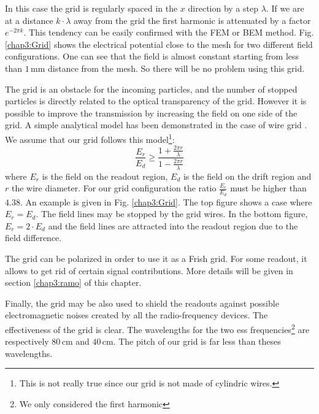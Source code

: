 \begin{refsection}
  In this case the grid is regularly spaced in the $x$ direction by a step $\lambda$. If we are at a distance $k \cdot \lambda$ away from the grid the first harmonic is attenuated by a factor $e^{-2\pi k}$. This tendency can be easily confirmed with the FEM or BEM method. Fig. \ref{chap3:Grid} shows the electrical potential close to the mesh for two different field configurations. One can see that the field is almost constant starting from less than $1\,\mathrm{mm}$ distance from the mesh. So there will be no problem using this grid.

  

  The grid is an obstacle for the incoming particles, and the number of stopped particles is directly related to the optical transparency of the grid. However it is possible to improve the transmission by increasing the field on one side of the grid. A simple analytical model has been demonstrated in the case of wire grid \cite{Bunemann1949}. We assume that our grid follows this model\footnote{This is not really true since our grid is not made of cylindric wires.}:
  \begin{equation}
    \frac{E_{r}}{E_{d}} \geq \frac{1+\frac{2 \pi r}{\lambda}}{1-\frac{2 \pi r}{\lambda}}
  \end{equation}
  where $E_{r}$ is the field on the readout region, $E_{d}$ is the field on the drift region and $r$ the wire diameter. For our grid configuration the ratio $\frac{E_{r}}{E_{d}}$ must be higher than $4.38$.
  An example is given in Fig. \ref{chap3:Grid}. The top figure shows a case where $E_{r}=E_{d}$. The field lines may be stopped by the grid wires. In the bottom figure, $E_{r}=2 \cdot E_{d}$ and the field lines are attracted into the readout region due to the field difference.

  The grid can be polarized in order to use it as a Frish grid. For some readout, it allows to get rid of certain signal contributions. More details will be given in section \ref{chap3:ramo} of this chapter.

  Finally, the grid may be also used to shield the readouts against possible electromagnetic noises created by all the radio-frequency devices. The effectiveness of the grid is clear. The wavelengths for the two \acrshort{ess} frequencies\footnote{We only considered the first harmonic} are respectively $80\,\mathrm{cm}$ and $40\,\mathrm{cm}$. The pitch of our grid is far less than theses wavelengths.



\end{refsection}

